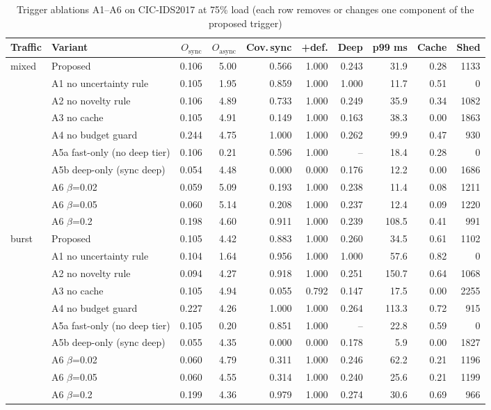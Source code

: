 \begin{table}[!htbp]
\centering
\caption{Trigger ablations A1--A6 on CIC-IDS2017 at 75\% load (each row removes or changes one component of the proposed trigger)}
\label{tab:ablation:cic2017_XGB_T3}
\scriptsize
\setlength{\tabcolsep}{3.5pt}
\begin{tabular}{llrrrrrrrr}
\toprule
\textbf{Traffic} & \textbf{Variant} & \textbf{$O_{\mathrm{sync}}$} & \textbf{$O_{\mathrm{async}}$} & \textbf{Cov.\,sync} & \textbf{+def.} & \textbf{Deep} & \textbf{p99 ms} & \textbf{Cache} & \textbf{Shed} \\
\midrule
mixed & Proposed & 0.106 & 5.00 & 0.566 & 1.000 & 0.243 & 31.9 & 0.28 & 1133 \\
 & A1 no uncertainty rule & 0.105 & 1.95 & 0.859 & 1.000 & 1.000 & 11.7 & 0.51 & 0 \\
 & A2 no novelty rule & 0.106 & 4.89 & 0.733 & 1.000 & 0.249 & 35.9 & 0.34 & 1082 \\
 & A3 no cache & 0.105 & 4.91 & 0.149 & 1.000 & 0.163 & 38.3 & 0.00 & 1863 \\
 & A4 no budget guard & 0.244 & 4.75 & 1.000 & 1.000 & 0.262 & 99.9 & 0.47 & 930 \\
 & A5a fast-only (no deep tier) & 0.106 & 0.21 & 0.596 & 1.000 & -- & 18.4 & 0.28 & 0 \\
 & A5b deep-only (sync deep) & 0.054 & 4.48 & 0.000 & 0.000 & 0.176 & 12.2 & 0.00 & 1686 \\
 & A6 $\beta$=0.02 & 0.059 & 5.09 & 0.193 & 1.000 & 0.238 & 11.4 & 0.08 & 1211 \\
 & A6 $\beta$=0.05 & 0.060 & 5.14 & 0.208 & 1.000 & 0.237 & 12.4 & 0.09 & 1220 \\
 & A6 $\beta$=0.2 & 0.198 & 4.60 & 0.911 & 1.000 & 0.239 & 108.5 & 0.41 & 991 \\
\midrule
burst & Proposed & 0.105 & 4.42 & 0.883 & 1.000 & 0.260 & 34.5 & 0.61 & 1102 \\
 & A1 no uncertainty rule & 0.104 & 1.64 & 0.956 & 1.000 & 1.000 & 57.6 & 0.82 & 0 \\
 & A2 no novelty rule & 0.094 & 4.27 & 0.918 & 1.000 & 0.251 & 150.7 & 0.64 & 1068 \\
 & A3 no cache & 0.105 & 4.94 & 0.055 & 0.792 & 0.147 & 17.5 & 0.00 & 2255 \\
 & A4 no budget guard & 0.227 & 4.26 & 1.000 & 1.000 & 0.264 & 113.3 & 0.72 & 915 \\
 & A5a fast-only (no deep tier) & 0.105 & 0.20 & 0.851 & 1.000 & -- & 22.8 & 0.59 & 0 \\
 & A5b deep-only (sync deep) & 0.055 & 4.35 & 0.000 & 0.000 & 0.178 & 5.9 & 0.00 & 1827 \\
 & A6 $\beta$=0.02 & 0.060 & 4.79 & 0.311 & 1.000 & 0.246 & 62.2 & 0.21 & 1196 \\
 & A6 $\beta$=0.05 & 0.060 & 4.55 & 0.314 & 1.000 & 0.240 & 25.6 & 0.21 & 1199 \\
 & A6 $\beta$=0.2 & 0.199 & 4.36 & 0.979 & 1.000 & 0.274 & 30.6 & 0.69 & 966 \\
\bottomrule
\end{tabular}
\end{table}
